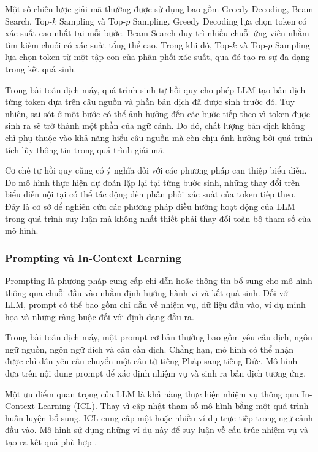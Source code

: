 Một số chiến lược giải mã thường được sử dụng bao gồm Greedy Decoding, Beam Search, Top-$k$ Sampling và Top-$p$ Sampling. Greedy Decoding lựa chọn token có xác suất cao nhất tại mỗi bước. Beam Search duy trì nhiều chuỗi ứng viên nhằm tìm kiếm chuỗi có xác suất tổng thể cao. Trong khi đó, Top-$k$ và Top-$p$ Sampling lựa chọn token từ một tập con của phân phối xác suất, qua đó tạo ra sự đa dạng trong kết quả sinh.

Trong bài toán dịch máy, quá trình sinh tự hồi quy cho phép LLM tạo bản dịch từng token dựa trên câu nguồn và phần bản dịch đã được sinh trước đó. Tuy nhiên, sai sót ở một bước có thể ảnh hưởng đến các bước tiếp theo vì token được sinh ra sẽ trở thành một phần của ngữ cảnh. Do đó, chất lượng bản dịch không chỉ phụ thuộc vào khả năng hiểu câu nguồn mà còn chịu ảnh hưởng bởi quá trình tích lũy thông tin trong quá trình giải mã.

Cơ chế tự hồi quy cũng có ý nghĩa đối với các phương pháp can thiệp biểu diễn. Do mô hình thực hiện dự đoán lặp lại tại từng bước sinh, những thay đổi trên biểu diễn nội tại có thể tác động đến phân phối xác suất của token tiếp theo. Đây là cơ sở để nghiên cứu các phương pháp điều hướng hoạt động của LLM trong quá trình suy luận mà không nhất thiết phải thay đổi toàn bộ tham số của mô hình.

\subsubsection{Prompting và In-Context Learning}

Prompting là phương pháp cung cấp chỉ dẫn hoặc thông tin bổ sung cho mô hình thông qua chuỗi đầu vào nhằm định hướng hành vi và kết quả sinh. Đối với LLM, prompt có thể bao gồm chỉ dẫn về nhiệm vụ, dữ liệu đầu vào, ví dụ minh họa và những ràng buộc đối với định dạng đầu ra.

Trong bài toán dịch máy, một prompt cơ bản thường bao gồm yêu cầu dịch, ngôn ngữ nguồn, ngôn ngữ đích và câu cần dịch. Chẳng hạn, mô hình có thể nhận được chỉ dẫn yêu cầu chuyển một câu từ tiếng Pháp sang tiếng Đức. Mô hình dựa trên nội dung prompt để xác định nhiệm vụ và sinh ra bản dịch tương ứng.

Một ưu điểm quan trọng của LLM là khả năng thực hiện nhiệm vụ thông qua In-Context Learning (ICL). Thay vì cập nhật tham số mô hình bằng một quá trình huấn luyện bổ sung, ICL cung cấp một hoặc nhiều ví dụ trực tiếp trong ngữ cảnh đầu vào. Mô hình sử dụng những ví dụ này để suy luận về cấu trúc nhiệm vụ và tạo ra kết quả phù hợp \cite{brown2020language}.

